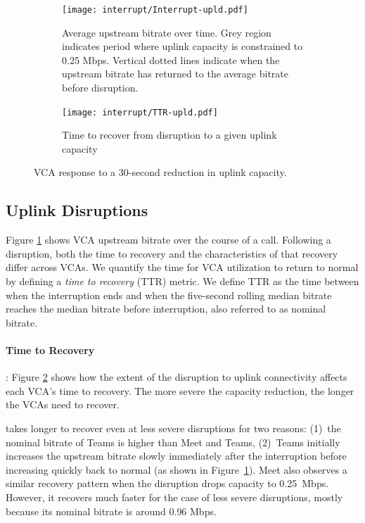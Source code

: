 \begin{figure}[t!]
\centering
\begin{subfigure}[t]{.5\textwidth}
    \centering
    \texttt{[image: interrupt/Interrupt-upld.pdf]}
    \caption{Average upstream bitrate over time. Grey region indicates period where uplink capacity is constrained to 0.25 Mbps. Vertical dotted lines indicate when the upstream bitrate has returned to the average bitrate before disruption.}
    \label{fig:ts_upld}
\end{subfigure}\hfill
\begin{subfigure}[t]{.5\textwidth}
      \centering
    \texttt{[image: interrupt/TTR-upld.pdf]}
    \caption{Time to recover from disruption to a given uplink capacity}
    \label{fig:TTR_upld}
\end{subfigure}
\caption{VCA response to a 30-second reduction in uplink capacity.}
\label{fig:interrupt-upld}
\end{figure}

\subsection{Uplink Disruptions}

Figure \ref{fig:ts_upld} shows VCA upstream bitrate over the course of a
call. Following a disruption, both the time to recovery and the
characteristics of that recovery
differ across VCAs. We quantify the time for
VCA utilization to return to normal by defining a 
\textit{time to recovery} (TTR) metric. We define TTR as the time between when the
interruption ends and when the five-second rolling median bitrate reaches the
median bitrate before interruption, also referred to as nominal bitrate. 

\paragraph{Time to Recovery}: Figure \ref{fig:TTR_upld} shows how the extent of
the disruption to uplink connectivity affects each VCA's time to recovery.
The more severe the capacity reduction, the longer the VCAs need to recover.

\teams takes longer to recover even at less severe disruptions for two
reasons: (1)~the nominal bitrate of Teams is higher than Meet and Teams,
(2)~Teams initially increases the upstream bitrate slowly immediately after the
interruption before increasing quickly back to normal (as shown in
Figure~\ref{fig:ts_upld}). Meet also observes a similar recovery pattern when
the disruption drops capacity to 0.25~Mbps. However, it recovers much faster
for the case of less severe disruptions, mostly because its nominal bitrate is
around 0.96 Mbps. 

